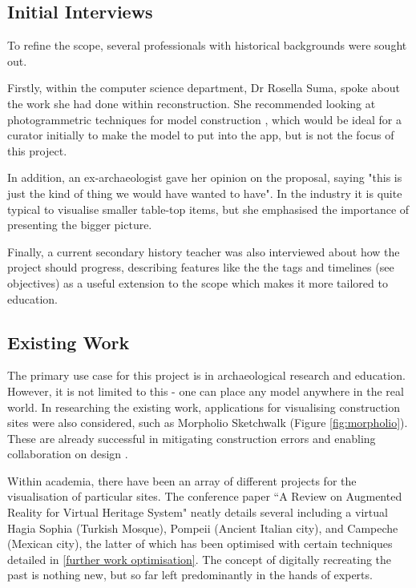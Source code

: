 \documentclass{article}
\begin{document}
\subsection{Initial Interviews}
To refine the scope, several professionals with historical backgrounds were sought out. 

Firstly, within the computer science department, Dr Rosella Suma, spoke about the work she had done within reconstruction. She recommended looking at photogrammetric techniques for model construction \cite{interviews:rosellapaper}, which would be ideal for a curator initially to make the model to put into the app, but is not the focus of this project. 

In addition, an ex-archaeologist gave her opinion on the proposal, saying "this is just the kind of thing we would have wanted to have". In the industry it is quite typical to visualise smaller table-top items, but she emphasised the importance of presenting the bigger picture.

Finally, a current secondary history teacher was also interviewed about how the project should progress, describing features like the the tags and timelines (see objectives) as a useful extension to the scope which makes it more tailored to education. 

\subsection{Existing Work}
\label{existingwork}
The primary use case for this project is in archaeological research and education. However, it is not limited to this - one can place any model anywhere in the real world. In researching the existing work, applications for visualising construction sites were also considered, such as Morpholio Sketchwalk (Figure \ref{fig:morpholio}). These are already successful in mitigating construction errors and enabling collaboration on design \cite{existing:ardesign}. 

Within academia, there have been an array of different projects for the visualisation of particular sites. The conference paper ``A Review on Augmented Reality for Virtual Heritage System" \cite{existing:virtualhertitagereview} neatly details several including a virtual Hagia Sophia \cite{existing:hagia} (Turkish Mosque), Pompeii \cite{existing:pompeii} (Ancient Italian city), and Campeche 
\cite{existing:campeche} (Mexican city), the latter of which has been optimised with certain techniques detailed in \ref{further work optimisation}. The concept of digitally recreating the past is nothing new, but so far left predominantly in the hands of experts.
\end{document}

